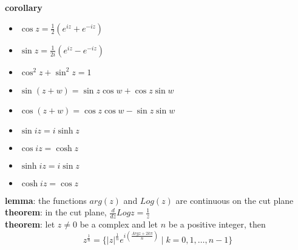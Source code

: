 \documentclass[a4paper]{article}
\newcommand*\abs[1]{\vert #1 \vert}
\begin{document}
\begin{framed}
	\noindent
	\textbf{corollary}
		\begin{multicols}{3}
		\begin{itemize}
			\item $\cos z = \frac{1}{2}(e^{iz} + e^{-iz})$
			\item $\sin z = \frac{1}{2i}(e^{iz} - e^{-iz})$
			\item $\cos^2 z + \sin^2 z = 1$
		\end{itemize}
	\end{multicols}
	\begin{multicols}{2}
		\begin{itemize}
			\item $\sin(z + w) = \sin z \cos w + \cos z \sin w$
			\item $\cos(z + w) = \cos z \cos w - \sin z \sin w$
		\end{itemize}
	\end{multicols}
	\begin{multicols}{4}
		\begin{itemize}
			\item $\sin iz = i\sinh z$
			\item $\cos iz = \cosh z$
			\item $\sinh iz = i \sin z$
			\item $\cosh iz = \cos z$
		\end{itemize}
	\end{multicols}
	
	\noindent
	\textbf{lemma}: the functions $arg(z)$ and $Log(z)$ are continuous on the cut plane\\
	
	\noindent
	\textbf{theorem}: in the cut plane, $\frac{d}{dz} Log z = \frac{1}{z}$\\
	
	\noindent
	\textbf{theorem}: let $z \neq 0$ be a complex and let $n$ be a positive integer, then $$z^{\frac{1}{n}} = \{ \abs{z}^{\frac{1}{n}} e^{i (\frac{Argz + 2k\pi}{n})} \; \vert \; k = 0, 1, \dots, n - 1 \}$$
\end{framed}
\end{document}
